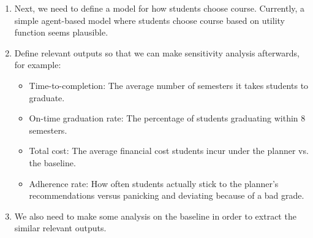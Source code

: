 \documentclass[10pt,a4paper]{article}
\begin{document}
\begin{enumerate}
    \texttt{expected score rises with (ability - difficulty)}  
    
    \texttt{actual score = that + noise, kept inside 0-10}

    Beyond the individual abilities and difficulties, the whole model needs only about four numbers:
        \begin{itemize}
            \item the spread of course difficulties
            \item how steeply ability separates students (discrimination)
            \item the noise level
            \item optionally, a year effect and a retake effect
        \end{itemize}

    \item Next, we need to define a model for how students choose course. Currently, a simple agent-based model where students choose course based on utility function seems plausible. 

    \item Define relevant outputs so that we can make sensitivity analysis afterwards, for example:
        \begin{itemize}
            \item Time-to-completion: The average number of semesters it takes students to graduate.

            \item On-time graduation rate: The percentage of students graduating within 8 semesters.

            \item Total cost: The average financial cost students incur under the planner vs. the baseline.

            \item Adherence rate: How often students actually stick to the planner's recommendations versus panicking and deviating because of a bad grade.
        \end{itemize}

    \item We also need to make some analysis on the baseline in order to extract the similar relevant outputs.


\end{enumerate}
\end{document}
